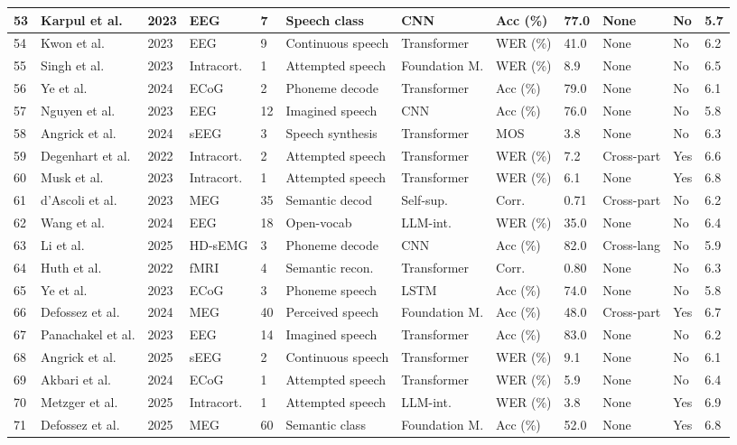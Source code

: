 \documentclass[11pt,a4paper]{article}
\begin{document}
{\begin{longtable}{|p{0.6cm}|p{1.8cm}|p{0.5cm}|p{1.2cm}|p{0.6cm}|p{1.0cm}|p{1.0cm}|p{0.8cm}|p{1.0cm}|p{1.0cm}|p{0.6cm}|p{0.6cm}|}
\hline
53 & Karpul et al. & 2023 & EEG & 7 & Speech class & CNN & Acc (\%) & 77.0 & None & No & 5.7 \\
\hline
54 & Kwon et al. & 2023 & EEG & 9 & Continuous speech & Transformer & WER (\%) & 41.0 & None & No & 6.2 \\
\hline
55 & Singh et al. & 2023 & Intracort. & 1 & Attempted speech & Foundation M. & WER (\%) & 8.9 & None & No & 6.5 \\
\hline
56 & Ye et al. & 2024 & ECoG & 2 & Phoneme decode & Transformer & Acc (\%) & 79.0 & None & No & 6.1 \\
\hline
57 & Nguyen et al. & 2023 & EEG & 12 & Imagined speech & CNN & Acc (\%) & 76.0 & None & No & 5.8 \\
\hline
58 & Angrick et al. & 2024 & sEEG & 3 & Speech synthesis & Transformer & MOS & 3.8 & None & No & 6.3 \\
\hline
59 & Degenhart et al. & 2022 & Intracort. & 2 & Attempted speech & Transformer & WER (\%) & 7.2 & Cross-part & Yes & 6.6 \\
\hline
60 & Musk et al. & 2023 & Intracort. & 1 & Attempted speech & Transformer & WER (\%) & 6.1 & None & Yes & 6.8 \\
\hline
61 & d'Ascoli et al. & 2023 & MEG & 35 & Semantic decod & Self-sup. & Corr. & 0.71 & Cross-part & No & 6.2 \\
\hline
62 & Wang et al. & 2024 & EEG & 18 & Open-vocab & LLM-int. & WER (\%) & 35.0 & None & No & 6.4 \\
\hline
63 & Li et al. & 2025 & HD-sEMG & 3 & Phoneme decode & CNN & Acc (\%) & 82.0 & Cross-lang & No & 5.9 \\
\hline
64 & Huth et al. & 2022 & fMRI & 4 & Semantic recon. & Transformer & Corr. & 0.80 & None & No & 6.3 \\
\hline
65 & Ye et al. & 2023 & ECoG & 3 & Phoneme speech & LSTM & Acc (\%) & 74.0 & None & No & 5.8 \\
\hline
66 & Defossez et al. & 2024 & MEG & 40 & Perceived speech & Foundation M. & Acc (\%) & 48.0 & Cross-part & Yes & 6.7 \\
\hline
67 & Panachakel et al. & 2023 & EEG & 14 & Imagined speech & Transformer & Acc (\%) & 83.0 & None & No & 6.2 \\
\hline
68 & Angrick et al. & 2025 & sEEG & 2 & Continuous speech & Transformer & WER (\%) & 9.1 & None & No & 6.1 \\
\hline
69 & Akbari et al. & 2024 & ECoG & 1 & Attempted speech & Transformer & WER (\%) & 5.9 & None & No & 6.4 \\
\hline
70 & Metzger et al. & 2025 & Intracort. & 1 & Attempted speech & LLM-int. & WER (\%) & 3.8 & None & Yes & 6.9 \\
\hline
71 & Defossez et al. & 2025 & MEG & 60 & Semantic class & Foundation M. & Acc (\%) & 52.0 & None & Yes & 6.8 \\
\hline

\end{longtable}
}
\end{document}
